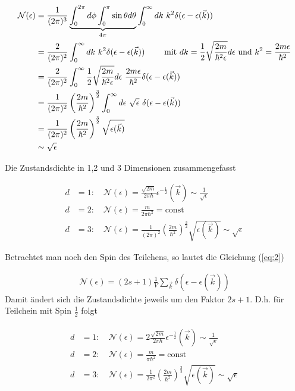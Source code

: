\begin{align}
  \label{eq:16}
  \mathcal N(\epsilon) &=\frac{1}{(2\pi)^3} \underbr{\int_0^{2\pi}d\phi \int_0^{\pi}\sin\theta d\theta }_{4\pi} \int_0^{\infty} dk \,\, k^2   \delta(\epsilon - \epsilon(\vec k))  \notag\\
&=\frac{2}{(2\pi)^2}\int_0^{\infty} dk \,\, k^2   \delta(\epsilon - \epsilon(\vec k))  \qquad \text{ mit }dk = \frac{1}{2} \sqrt{\frac{2m}{\hbar^2  \epsilon}} d\epsilon \text{ und }  k^2 = \frac{2m \epsilon}{\hbar^2} \notag\\
&=\frac{2}{(2\pi)^2}\int_0^{\infty} \frac{1}{2} \sqrt{\frac{2m}{\hbar^2  \epsilon}} d\epsilon \,\, \frac{2m \epsilon}{\hbar^2}  \delta(\epsilon - \epsilon(\vec k))  \notag\\
&=\frac{1}{(2\pi)^2} \left(\frac{2m}{\hbar^2}\right)^{\frac{3}{2}}  \int_0^{\infty}  d\epsilon \,\, \sqrt{\epsilon} \,\, \delta(\epsilon - \epsilon(\vec k))  \notag\\
&=\frac{1}{(2\pi)^2} \left(\frac{2m}{\hbar^2}\right)^{\frac{3}{2}} \sqrt{\epsilon(\vec k)}\notag\\
&\sim \sqrt{\epsilon}
\end{align}


Die Zustandsdichte in 1,2 und 3 Dimensionen zusammengefasst

\begin{equation}
  \label{eq:10}
 \boxed{ \begin{aligned}
       d&=1: \quad \mathcal N(\epsilon) = \frac{\sqrt{2m}}{2\pi\hbar}  \epsilon^{-\frac{1}{2}}(\vec k) \sim \frac{1}{\sqrt{\epsilon}} \\
d&=2: \quad \mathcal N(\epsilon) = \frac{m}{2\pi\hbar^2 } = \text{const} \\
d&=3: \quad \mathcal N(\epsilon) = \frac{1}{(2\pi)^2} \left(\frac{2m}{\hbar^2}\right)^{\frac{3}{2}} \sqrt{\epsilon(\vec k)}\sim \sqrt{\epsilon}
  \end{aligned}  }
\end{equation}


Betrachtet man noch den Spin des Teilchens, so lautet die Gleichung (\ref{eq:2})

\begin{align}
  \label{eq:17}
  \mathcal N(\epsilon) = (2s+1)\frac{1}{V} \sum_{\vec k} \delta(\epsilon - \epsilon(\vec k))
\end{align}
Damit ändert sich die Zustandsdichte jeweils um den Faktor \(2s+1\). D.h. für Teilchein mit Spin \(\frac{1}{2}\) folgt

\begin{align}
  \label{eq:19}
   \boxed{ \begin{aligned}
       d&=1: \quad \mathcal N(\epsilon) = 2\frac{\sqrt{2m}}{2\pi\hbar}  \epsilon^{-\frac{1}{2}}(\vec k) \sim \frac{1}{\sqrt{\epsilon}} \\
d&=2: \quad \mathcal N(\epsilon) = \frac{m}{\pi\hbar^2 } = \text{const} \\
d&=3: \quad \mathcal N(\epsilon) = \frac{1}{2\pi^2} \left(\frac{2m}{\hbar^2}\right)^{\frac{3}{2}} \sqrt{\epsilon(\vec k)}\sim \sqrt{\epsilon}
  \end{aligned}  }
\end{align}





